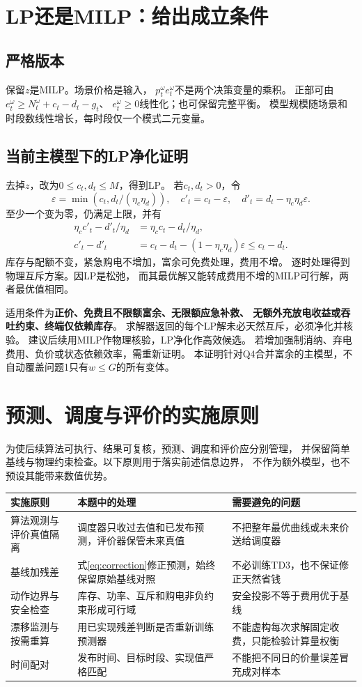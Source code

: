 \documentclass[UTF8,11pt]{ctexart}
\begin{document}
\section{LP还是MILP：给出成立条件}
\subsection{严格版本}
保留$z$是MILP。场景价格是输入，
$p_t^\omega e_t^\omega$不是两个决策变量的乘积。
正部可由$e_t^\omega\geq N_t^\omega+c_t-d_t-g_t$、
$e_t^\omega\geq0$线性化；也可保留完整平衡。
模型规模随场景和时段数线性增长，每时段仅一个模式二元变量。

\subsection{当前主模型下的LP净化证明}
去掉$z$，改为$0\leq c_t,d_t\leq M$，得到LP。
若$c_t,d_t>0$，令
\begin{equation}
 \varepsilon=\min(c_t,d_t/(\eta_c\eta_d)),\quad
 c'_t=c_t-\varepsilon,\quad d'_t=d_t-\eta_c\eta_d\varepsilon .
\end{equation}
至少一个变为零，仍满足上限，并有
\begin{align}
 \eta_c c'_t-d'_t/\eta_d&=\eta_c c_t-d_t/\eta_d,\\
 c'_t-d'_t&=c_t-d_t-(1-\eta_c\eta_d)\varepsilon\leq c_t-d_t.
\end{align}
库存与配额不变，紧急购电不增加，富余可免费处理，费用不增。
逐时处理得到物理互斥方案。因LP是松弛，
而其最优解又能转成费用不增的MILP可行解，两者最优值相同。

适用条件为\textbf{正价、免费且不限额富余、无限额应急补救、
无额外充放电收益或吞吐约束、终端仅依赖库存}。
求解器返回的每个LP解未必天然互斥，必须净化并核验。
建议后续用MILP作物理核验，LP净化作高效候选。
若增加强制消纳、弃电费用、负价或状态依赖效率，需重新证明。
本证明针对Q4合并富余的主模型，不自动覆盖问题1只有$w\leq G$的所有变体。

\section{预测、调度与评价的实施原则}
为使后续算法可执行、结果可复核，预测、调度和评价应分别管理，
并保留简单基线与物理约束检查。以下原则用于落实前述信息边界，
不作为额外模型，也不预设其能带来数值优势。
\begin{longtable}{p{3.0cm}p{5.0cm}p{5.8cm}}
\toprule 实施原则 & 本题中的处理 & 需要避免的问题\\ \midrule
\endhead
算法观测与评价真值隔离 &
调度器只收过去值和已发布预测，评价器保管未来真值 &
不把整年最优曲线或未来价送给调度器\\
基线加残差 &
式\eqref{eq:correction}修正预测，始终保留原始基线对照 &
不必训练TD3，也不保证修正天然省钱\\
动作边界与安全检查 &
库存、功率、互斥和购电非负约束形成可行域 &
安全投影不等于费用优于基线\\
漂移监测与按需重算 &
用已实现残差判断是否重新训练预测器 &
不能虚构每次求解固定收费，只能检验计算量权衡\\
时间配对 &
发布时间、目标时段、实现值严格匹配 &
不能把不同日的价量误差冒充成对样本\\
\bottomrule
\end{longtable}
\end{document}
